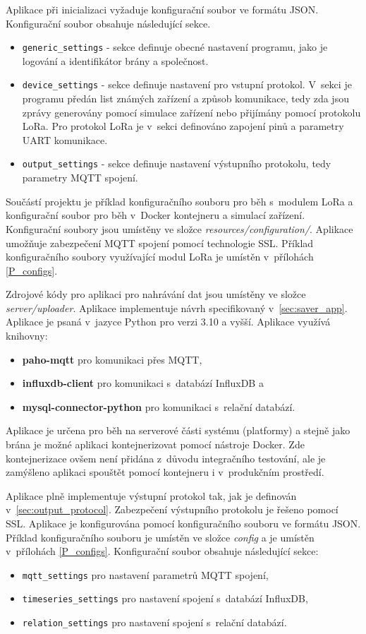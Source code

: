 Aplikace při inicializaci vyžaduje konfigurační soubor ve formátu JSON. Konfigurační soubor obsahuje následující sekce.
\begin{itemize}
    \item \texttt{generic\_settings} - sekce definuje obecné nastavení programu, jako je logování a identifikátor brány a společnost.
    \item \texttt{device\_settings} - sekce definuje nastavení pro vstupní protokol. V~sekci je programu předán list známých zařízení a způsob komunikace, tedy zda jsou zprávy generovány pomocí simulace zařízení nebo přijímány pomocí protokolu LoRa. Pro protokol LoRa je v~sekci definováno zapojení pinů a parametry UART komunikace.
    \item \texttt{output\_settings} - sekce definuje nastavení výstupního protokolu, tedy parametry MQTT spojení.
\end{itemize}
Součástí projektu je příklad konfiguračního souboru pro běh s~modulem LoRa a konfigurační soubor pro běh v~Docker kontejneru a simulací zařízení. Konfigurační soubory jsou umístěny ve složce \textit{resources/configuration/}. Aplikace umožňuje zabezpečení MQTT spojení pomocí technologie SSL. Příklad konfiguračního soubory využívající modul LoRa je umístěn v~přílohách \ref{P_configs}.

Zdrojové kódy pro aplikaci pro nahrávání dat jsou umístěny ve složce \textit{server/uploader}. Aplikace implementuje návrh specifikovaný v~\ref{sec:saver_app}. Aplikace je psaná v~jazyce Python pro verzi 3.10 a vyšší. Aplikace využívá knihovny:
\begin{itemize}
    \item \textbf{paho-mqtt} pro komunikaci přes MQTT,
    \item \textbf{influxdb-client} pro komunikaci s~databází InfluxDB a
    \item \textbf{mysql-connector-python} pro komunikaci s~relační databází.
\end{itemize}
Aplikace je určena pro běh na serverové části systému (platformy) a stejně jako brána je možné aplikaci kontejnerizovat pomocí nástroje Docker. Zde kontejnerizace ovšem není přidána z~důvodu integračního testování, ale je zamýšleno aplikaci spouštět pomocí kontejneru i v~produkčním prostředí.

Aplikace plně implementuje výstupní protokol tak, jak je definován v~\ref{sec:output_protocol}. Zabezpečení výstupního protokolu je řešeno pomocí SSL. Aplikace je konfigurována pomocí konfiguračního souboru ve formátu JSON. Příklad konfiguračního souboru je umístěn ve složce \textit{config} a je umístěn v~přílohách \ref{P_configs}. Konfigurační soubor obsahuje následující sekce:
\begin{itemize}
    \item \texttt{mqtt\_settings} pro nastavení parametrů MQTT spojení,
    \item \texttt{timeseries\_settings} pro nastavení spojení s~databází InfluxDB,
    \item \texttt{relation\_settings} pro nastavení spojení s~relační databází.
\end{itemize}

